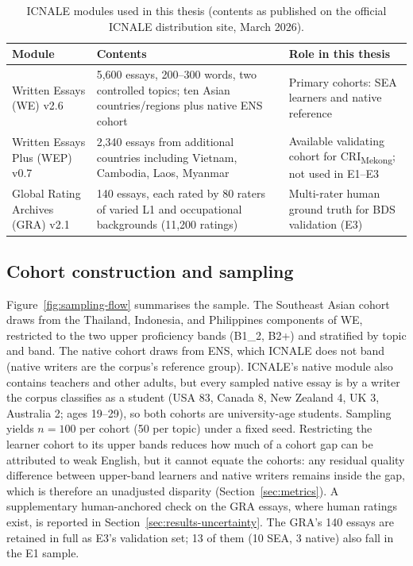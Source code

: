 \begin{table}[htbp]
\centering
\caption[ICNALE modules used in this thesis]{ICNALE modules used in
this thesis (contents as published on the official ICNALE
distribution site, March 2026).}
\label{tab:icnale-modules}
\small
\begin{tabular}{p{3.2cm} p{4.6cm} p{4.6cm}}
\hline
Module & Contents & Role in this thesis \\
\hline
Written Essays (WE) v2.6 & 5{,}600 essays, 200--300 words, two
controlled topics; ten Asian countries/regions plus native ENS cohort
& Primary cohorts: SEA learners and native reference \\[3pt]
Written Essays Plus (WEP) v0.7 & 2{,}340 essays from additional
countries including Vietnam, Cambodia, Laos, Myanmar & Available
validating cohort for CRI\textsubscript{Mekong}; not used in
E1--E3 \\[3pt]
Global Rating Archives (GRA) v2.1 & 140 essays, each rated by 80
raters of varied L1 and occupational backgrounds (11{,}200 ratings)
& Multi-rater human ground truth for BDS validation (E3) \\
\hline
\end{tabular}
\end{table}

\subsection*{Cohort construction and sampling}
Figure~\ref{fig:sampling-flow} summarises the sample. The Southeast
Asian cohort draws from the Thailand, Indonesia, and Philippines
components of WE, restricted to the two upper proficiency bands
(B1\_2, B2+) and stratified by topic and band. The native cohort
draws from ENS, which ICNALE does not band (native writers are the
corpus's reference group). ICNALE's native module also contains teachers and other adults,
but every sampled native essay is by a writer the corpus classifies
as a student (USA 83, Canada 8, New Zealand 4, UK 3, Australia 2;
ages 19--29), so both cohorts are university-age students. Sampling yields $n = 100$ per cohort
(50 per topic) under a fixed seed. Restricting the learner cohort to
its upper bands reduces how much of a cohort gap can be attributed
to weak English, but it cannot equate the cohorts: any residual
quality difference between upper-band learners and native writers
remains inside the gap, which is therefore an unadjusted disparity
(Section~\ref{sec:metrics}). A supplementary human-anchored check
on the GRA essays, where human ratings exist, is reported in
Section~\ref{sec:results-uncertainty}. The GRA's 140 essays are
retained in full as E3's validation set; 13 of them (10 SEA, 3
native) also fall in the E1 sample.

